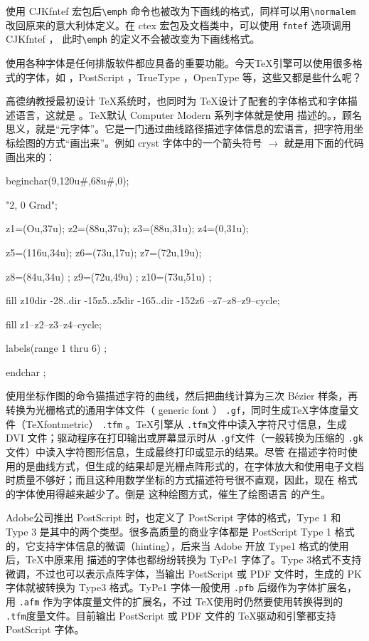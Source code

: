 使用 CJKfntef 宏包后\verb|\emph| 命令也被改为下画线的格式，同样可以用\verb|\normalem| 改回原来的意大利体定义。在 ctex 宏包及文档类中，可以使用 \verb|fntef| 选项调用 CJKfntef ，
此时\verb|\emph| 的定义不会被改变为下画线格式。

{
    \qquad 使用各种字体是任何排版软件都应具备的重要功能。今天\TeX 引擎可以使用很多格式的字体，如 \MF ，PostScript ，TrueType ，OpenType 等，这些又都是些什么呢？

    \qquad 高德纳教授最初设计 \TeX 系统时，也同时为 \TeX 设计了配套的字体格式和字体描述语言，这就是 \MF 。\TeX 默认 Computer Modern 系列字体就是使用 \MF 描述的。\MF ，顾名思义，就是“元字体”。它是一门通过曲线路径描述字体信息的宏语言，把字符用坐标绘图的方式“画出来”。例如 cryst 字体中的一个箭头符号 $\to$ 就是用下面的代码画出来的：

    {\ttfamily
\qquad beginchar(9,120u\#,68u\#,0);

\qquad "2, 0 Grad";

\qquad z1=(Ou,37u); z2=(88u,37u); z3=(88u,31u); z4=(0,31u);

\qquad z5=(116u,34u); z6=(73u,17u); z7=(72u,19u);

\qquad z8=(84u,34u) ; z9=(72u,49u) ; z10=(73u,51u) ;

\qquad fill z10{dir -28}..{dir -15}z5..z5{dir -165}..{dir -152}z6
--z7--z8--z9--cycle;

\qquad fill z1--z2--z3--z4--cycle;

\qquad labels(range 1 thru 6) ;

\qquad endchar ;}

\qquad \MF 使用坐标作图的命令猫描述字符的曲线，然后把曲线计算为三次 Bézier 样条，再转换为光栅格式的通用字体文件（ generic font ） \lstinline{.gf}，同时生成\TeX 字体度量文件（TeXfontmetric） \lstinline{.tfm} 。\TeX 引擎从 \lstinline{.tfm}文件中读入字符尺寸信息，生成 DVI 文件；驱动程序在打印输出或屏幕显示时从 \lstinline{.gf}文件（一般转换为压缩的 \lstinline{.gk}文件）中读入字符图形信息，生成最终打印或显示的结果。尽管 \MF 在描述字符时使用的是曲线方式，但生成的结果却是光栅点阵形式的，在字体放大和使用电子文档时质量不够好；而且这种用数学坐标的方式描述符号很不直观，因此，现在 \MF 格式的字体使用得越来越少了。倒是 \MF 这种绘图方式，催生了绘图语言 \MP 的产生。

\qquad Adobe公司推出 PostScript 时，也定义了 PostScript 字体的格式，Type 1 和 Type 3 是其中的两个类型。很多高质量的商业字体都是 PostScript Type 1 格式的，它支持字体信息的微调（hinting），后来当 Adobe 开放 Type1 格式的使用后，\TeX 中原来用 \MF 描述的字体也都纷纷转换为 TyPe1 字体了。Type 3格式不支持微调，不过也可以表示点阵字体，当输出 PostScript 或
PDF 文件时，\MF 生成的 PK 字体就被转换为 Type3 格式。TyPe1 字体一般使用 \lstinline{.pfb} 后缀作为字体扩展名，用 \lstinline{.afm} 作为字体度量文件的扩展名，不过 \TeX 使用时仍然要使用转换得到的 \lstinline{.tfm}度量文件。目前输出 PostScript 或 PDF 文件的 \TeX 驱动和引擎都支持 PostScript 字体。

}
